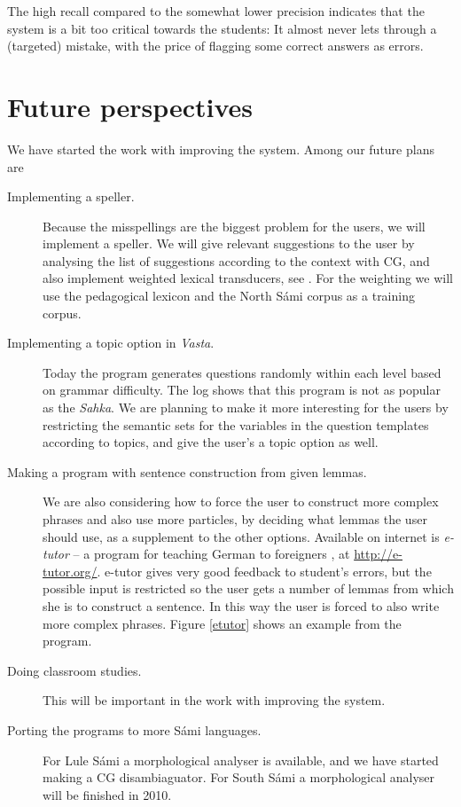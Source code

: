 \documentclass[11pt]{article}
\begin{document}
The high recall compared to the somewhat lower precision indicates that the system is a bit too critical towards the students: It almost never lets through a (targeted) mistake, with the price of flagging some correct answers as errors.
 
\section{Future perspectives}
We have started the work with improving the system. Among our future plans are
\begin{description}
\item [Implementing a speller.] Because the misspellings are the biggest problem for the users, we will implement a speller. We will give relevant suggestions to the user by analysing the list of suggestions according to the context with CG, and also implement weighted lexical transducers, see \cite{Linden:09}. For the weighting we will use the pedagogical lexicon and the North Sámi corpus as a training corpus.
\item [Implementing a topic option in \textit{Vasta}.] Today the program generates questions randomly within each level based on grammar difficulty. The log shows that this program is not as popular as the \textit{Sahka}. We are planning to make it more interesting for the users by restricting the semantic sets for the variables in the question templates according to topics, and give the user's a topic option as well.
\item [Making a program with sentence construction from given lemmas.] We are also considering how to force the user to construct more complex phrases and also use more particles, by deciding what lemmas the user should use, as a supplement to the other options. Available on internet is \textit{e-tutor} -- a program for teaching German to foreigners \cite{Heift:01}, at \url{http://e-tutor.org/}. e-tutor gives very good feedback to student's errors, but the possible input is restricted so the user gets a number of lemmas from which she is to construct a sentence. In this way the user is forced to also write more complex phrases. Figure \ref{etutor} shows an example from the program.
\item [Doing classroom studies.] This will be important in the work with improving the system.
\item [Porting the programs to more Sámi languages.] For Lule Sámi a morphological analyser is available, and we have started making a CG disambiaguator. For South Sámi a morphological analyser will be finished in 2010. 
  \end{description} 
  \vspace{0.7cm}
\end{document}
